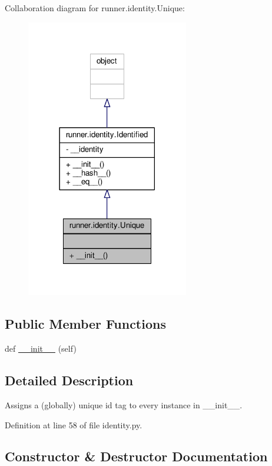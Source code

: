 Collaboration diagram for runner.\+identity.\+Unique\+:
\nopagebreak
\begin{figure}[H]
\begin{center}
\leavevmode
\includegraphics[width=201pt]{classrunner_1_1identity_1_1Unique__coll__graph}
\end{center}
\end{figure}
\subsection*{Public Member Functions}
\begin{DoxyCompactItemize}
\item 
def \hyperlink{classrunner_1_1identity_1_1Unique_a724cc247ca651a0567536ce717bb5d71}{\+\_\+\+\_\+init\+\_\+\+\_\+} (self)
\end{DoxyCompactItemize}


\subsection{Detailed Description}
\begin{DoxyVerb}Assigns a (globally) unique id tag to every instance in __init__.
\end{DoxyVerb}
 

Definition at line 58 of file identity.\+py.



\subsection{Constructor \& Destructor Documentation}
\hypertarget{classrunner_1_1identity_1_1Unique_a724cc247ca651a0567536ce717bb5d71}{}
